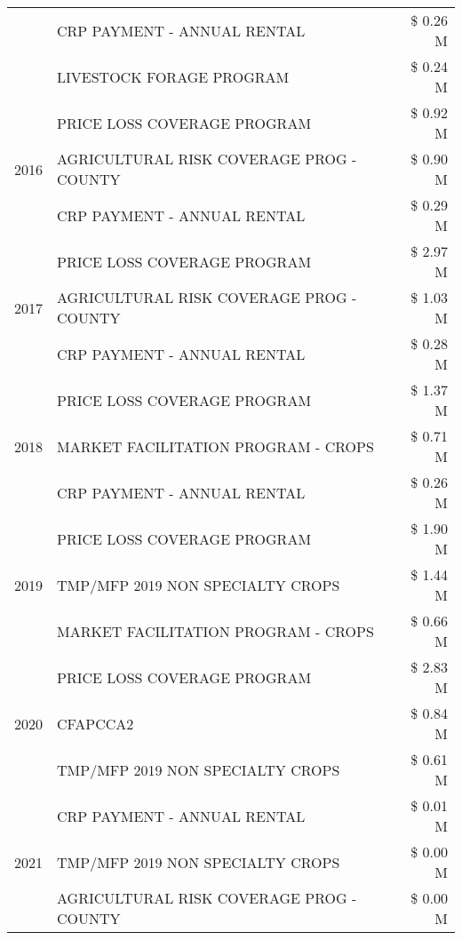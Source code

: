 \begin{tabular}{llr}
 & CRP PAYMENT - ANNUAL RENTAL & \$ 0.26 M \\
 & LIVESTOCK FORAGE PROGRAM & \$ 0.24 M \\
\cline{1-3}
\multirow[t]{3}{*}{2016} & PRICE LOSS COVERAGE PROGRAM & \$ 0.92 M \\
 & AGRICULTURAL RISK COVERAGE PROG - COUNTY & \$ 0.90 M \\
 & CRP PAYMENT - ANNUAL RENTAL & \$ 0.29 M \\
\cline{1-3}
\multirow[t]{3}{*}{2017} & PRICE LOSS COVERAGE PROGRAM & \$ 2.97 M \\
 & AGRICULTURAL RISK COVERAGE PROG - COUNTY & \$ 1.03 M \\
 & CRP PAYMENT - ANNUAL RENTAL & \$ 0.28 M \\
\cline{1-3}
\multirow[t]{3}{*}{2018} & PRICE LOSS COVERAGE PROGRAM & \$ 1.37 M \\
 & MARKET FACILITATION PROGRAM - CROPS & \$ 0.71 M \\
 & CRP PAYMENT - ANNUAL RENTAL & \$ 0.26 M \\
\cline{1-3}
\multirow[t]{3}{*}{2019} & PRICE LOSS COVERAGE PROGRAM & \$ 1.90 M \\
 & TMP/MFP 2019 NON SPECIALTY CROPS & \$ 1.44 M \\
 & MARKET FACILITATION PROGRAM - CROPS & \$ 0.66 M \\
\cline{1-3}
\multirow[t]{3}{*}{2020} & PRICE LOSS COVERAGE PROGRAM & \$ 2.83 M \\
 & CFAPCCA2 & \$ 0.84 M \\
 & TMP/MFP 2019 NON SPECIALTY CROPS & \$ 0.61 M \\
\cline{1-3}
\multirow[t]{3}{*}{2021} & CRP PAYMENT - ANNUAL RENTAL & \$ 0.01 M \\
 & TMP/MFP 2019 NON SPECIALTY CROPS & \$ 0.00 M \\
 & AGRICULTURAL RISK COVERAGE PROG - COUNTY & \$ 0.00 M \\
\cline{1-3}
\bottomrule
\end{tabular}
